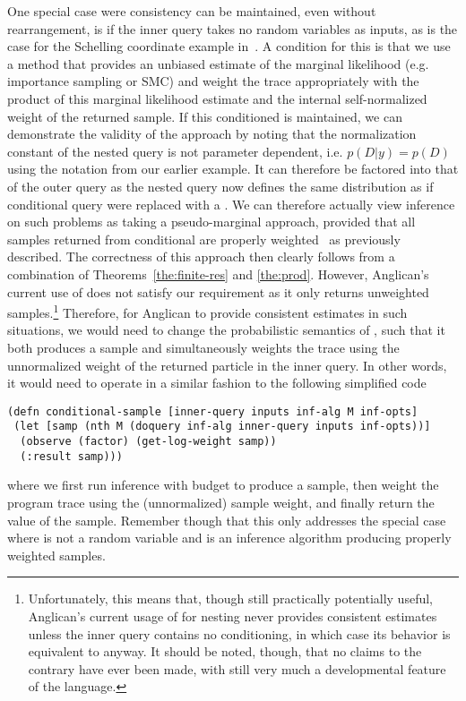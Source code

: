 One special case were consistency can be maintained, even without rearrangement,
 is if the inner query takes no 
random variables as inputs, as is the case for
the Schelling coordinate example in~\cite[Figure 6]{stuhlmuller2014reasoning}.  
A condition for this is that we use a method that provides an unbiased estimate of 
the marginal likelihood (e.g. importance sampling or SMC) and weight the trace appropriately
with the product of this marginal likelihood estimate and the internal self-normalized weight
of the returned sample.  
If this conditioned is maintained, we can demonstrate the validity of the approach by noting that
the normalization constant of the nested query is not parameter dependent, i.e. $p(D|y)=p(D)$ 
using the notation from our earlier example.  It can therefore 
be factored into that of the outer query as the nested query now defines the same distribution 
as if conditional query were replaced with a .  We can therefore actually view inference 
on such problems as taking a pseudo-marginal approach, provided that all samples returned from
conditional are properly weighted~\citep{naessethLS2015nested} as previously described.
The correctness of this approach then clearly follows from a combination of
Theorems~\ref{the:finite-res} and \ref{the:prod}.
However, Anglican's current use of \conditional does not
satisfy our requirement as it only returns unweighted samples.\footnote{Unfortunately, this
	means that, though still practically potentially useful, Anglican's current usage of {\footnotesize {}}
	for nesting never provides consistent estimates unless the inner query contains no conditioning, 
	in which
	case its behavior is equivalent to  anyway.  It should be noted, though, that no claims 
	to the contrary have ever been made, with  still very much a developmental feature
	of the language.}
Therefore, for Anglican to provide consistent estimates in such situations, we would need to
change the probabilistic semantics of \conditional, such that it
both produces a sample and simultaneously weights the trace using the unnormalized weight of the returned particle in the inner query.  In other words, it would need to operate in a similar fashion
to the following simplified code
\begin{lstlisting}[basicstyle=\ttfamily\footnotesize,frame=none]
(defn conditional-sample [inner-query inputs inf-alg M inf-opts]
 (let [samp (nth M (doquery inf-alg inner-query inputs inf-opts))]
  (observe (factor) (get-log-weight samp))
  (:result samp)))
\end{lstlisting}
\vspace{-10pt}
where we first run inference with budget  to produce a sample, then weight the program trace
using the (unnormalized) sample weight, and finally return the value of the sample.
Remember though that this only addresses the special case where  is not a random variable
and  is an inference algorithm producing properly weighted samples.

